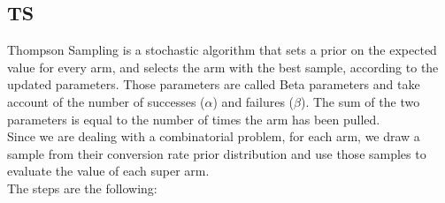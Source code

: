 \subsection{TS}
Thompson Sampling is a stochastic algorithm that sets a prior on the expected value for every arm, and selects the arm with the best sample, according to the updated parameters. Those parameters are called Beta parameters and take account of the number of successes ($\alpha$) and failures ($\beta$). The sum of the two parameters is equal to the number of times the arm has been pulled.\\
Since we are dealing with a combinatorial problem, for each arm, we draw a sample from their conversion rate prior distribution and use those samples to evaluate the value of each super arm.\\
The steps are the following:
